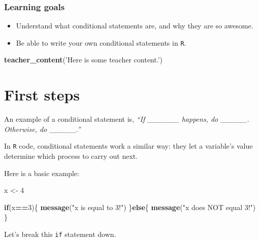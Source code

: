 \documentclass[
]{book}
\newenvironment{Shaded}{\begin{snugshade}}{\end{snugshade}}
\newcommand{\ControlFlowTok}[1]{\textcolor[rgb]{0.13,0.29,0.53}{\textbf{#1}}}
\newcommand{\DecValTok}[1]{\textcolor[rgb]{0.00,0.00,0.81}{#1}}
\newcommand{\KeywordTok}[1]{\textcolor[rgb]{0.13,0.29,0.53}{\textbf{#1}}}
\newcommand{\NormalTok}[1]{#1}
\newcommand{\OperatorTok}[1]{\textcolor[rgb]{0.81,0.36,0.00}{\textbf{#1}}}
\newcommand{\StringTok}[1]{\textcolor[rgb]{0.31,0.60,0.02}{#1}}
\providecommand{\tightlist}{%
  \setlength{\itemsep}{0pt}\setlength{\parskip}{0pt}}
\begin{document}
\hypertarget{learning-goals-25}{%
\subsubsection*{Learning goals}\label{learning-goals-25}}

\begin{itemize}
\tightlist
\item
  Understand what conditional statements are, and why they are so awesome.
\item
  Be able to write your own conditional statements in \texttt{R}.
\end{itemize}

\begin{Shaded}
\begin{Highlighting}[]
\KeywordTok{teacher_content}\NormalTok{(}\StringTok{'Here is some teacher content.'}\NormalTok{)}
\end{Highlighting}
\end{Shaded}

\hypertarget{first-steps-1}{%
\section*{First steps}\label{first-steps-1}}

An example of a conditional statement is, \emph{``If \_\_\_\_\_\_ happens, do \_\_\_\_\_. Otherwise, do \_\_\_\_\_.''}

In \texttt{R} code, conditional statements work a similar way: they let a variable's value determine which process to carry out next.

Here is a basic example:

\begin{Shaded}
\begin{Highlighting}[]
\NormalTok{x <-}\StringTok{ }\DecValTok{4}

\ControlFlowTok{if}\NormalTok{(x}\OperatorTok{==}\DecValTok{3}\NormalTok{)\{}
  \KeywordTok{message}\NormalTok{(}\StringTok{"x is equal to 3!"}\NormalTok{)}
\NormalTok{\}}\ControlFlowTok{else}\NormalTok{\{}
  \KeywordTok{message}\NormalTok{(}\StringTok{"x does NOT equal 3!"}\NormalTok{)}
\NormalTok{\}}
\end{Highlighting}
\end{Shaded}

Let's break this \texttt{if} statement down.
\end{document}
